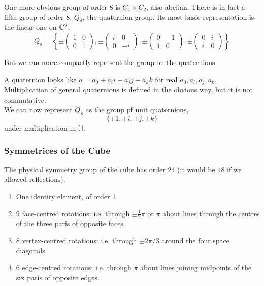 One more obvious group of order \(8\) is \(C_4 \times C_2\), also abelian. There is in fact a fifth group of order 8, \(Q_8\), the quaternion group. Its most basic representation is the linear one on \(\mathbb{C}^2\).
\[Q_8 = \left\{\pm \begin{pmatrix}
        1 & 0 \\ 0 & 1
    \end{pmatrix}, \pm \begin{pmatrix}
        i & 0 \\ 0 & -i
    \end{pmatrix}, \pm \begin{pmatrix}
        0 & -1 \\ 1 & 0
    \end{pmatrix}, \pm \begin{pmatrix}
        0 & i \\ i & 0
    \end{pmatrix}\right\}
\]

But we can more compactly represent the group on the quaternions.

A quaternion looks like \(a = a_0 + a_i i + a_j j + a_k k\) for real \(a_0, a_i, a_j, a_k\). Multiplication of general quaternions is defined in the obvious way, but it is not commutative. \\

We can now represent \(Q_8\) as the group pf unit quaternions,
\[\{\pm 1, \pm i, \pm j, \pm k\}\]
under multiplication in \(\mathbb{H}\).

\subsubsection{Symmetrices of the Cube}

The physical symmetry group of the cube has order 24 (it would be 48 if we allowed reflections).
\begin{enumerate}[label=\alph*)]
    \item One identity element, of order 1.
    \item 9 face-centred rotations: i.e. through \(\pm \frac{1}{2}\pi\) or \(\pi\) about lines through the centres of the three paris of opposite faces.
    \item 8 vertex-centred rotations: i.e. through \(\pm 2\pi / 3\) around the four space diagonals.
    \item 6 edge-centred rotations: i.e. through \(\pi\) about lines joining midpoints of the six paris of opposite edges.
\end{enumerate}

